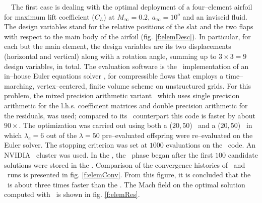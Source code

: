 \documentclass{vki_ls}
\newcommand{\xeraki}{\Pisymbol{ding}{13}~~}
\begin{document}
%
%
\xeraki The first case is dealing with the optimal deployment of a four--element airfoil for maximum lift coefficient ($C_L$) at $M_{\infty} = 0.2$, $a_{\infty}=10^o$ and an inviscid fluid. The design variables stand for the relative positions of the slat and the two flaps with respect to the main body of the airfoil (fig. \ref{f:elemDesc}). In particular, for each but the main element, the design variables are its two displacements (horizontal and vertical) along with a rotation angle, summing up to $3\!\times\!3\!=\!9$ design variables, in total.
The evaluation software is the \GPU\ implementation of an in--house Euler equations solver \cite{LTT_2_047, LTT_2_051}, for compressible flows that employs a time--marching, vertex--centered, finite volume scheme on unstructured grids. 
For this problem, the mixed precision arithmetic variant \GPUM\ which uses single precision arithmetic for the l.h.s. coefficient matrices and double precision arithmetic for the residuals, was used; compared to its \CPU\ counterpart this code is faster by about $90\times$.
The optimization was carried out using both a ($20, 50$) \EA\ and a ($20, 50$) \MAEA\ in which $\lambda_e\!=\!6$ out of the $\lambda\!=\!50$ pre--evaluated offspring were re--evaluated on the Euler solver. The stopping criterion was set at $1000$ evaluations on the \GPUM\ code. An NVIDIA \GPU\ cluster was used.
In the \MAEA, the \IPE\ phase began after the first $100$ candidate solutions were stored in the \DB.
Comparison of the convergence histories of \EA\ and \MAEA\ runs is presented in fig. \ref{f:elemConv}. From this figure, it is concluded that the \MAEA\ is about three times faster than the \EA. The Mach field on the optimal solution computed with \MAEA\ is shown in fig. \ref{f:elemRes}.
\end{document}
